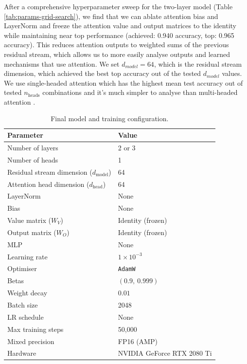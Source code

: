After a comprehensive hyperparameter sweep for the two-layer model (Table \ref{tab:params-grid-search}), we find that we can ablate attention bias and LayerNorm \cite{ba2016layer} and freeze the attention value and output matrices to the identity while maintaining near top performance (achieved: 0.940 accuracy, top: 0.965 accuracy). This reduces attention outputs to weighted sums of the previous residual stream, which allows us to more easily analyse outputs and learned mechanisms that use attention.
We set $d_{model} = 64$, which is the residual stream dimension, which achieved the best top accuracy out of the tested $d_{model}$ values.
We use single-headed attention which has the highest mean test accuracy out of tested $n_\text{heads}$ combinations and it's much simpler to analyse than multi-headed attention \cite{elhage2021mathematical}.

\begin{table}[htbp]
\caption{Final model and training configuration.}
\label{tab:model_config}
\centering
\begin{tabular}{lp{3.8cm}}
\toprule
\textbf{Parameter} & \textbf{Value} \\
\midrule
Number of layers & 2 or 3 \\
Number of heads & 1 \\
Residual stream dimension ($d_{\text{model}}$) & 64 \\
Attention head dimension ($d_{\text{head}}$) & 64 \\
LayerNorm & None \\
Bias & None \\
Value matrix ($W_V$) & Identity (frozen) \\
Output matrix ($W_O$) & Identity (frozen) \\
MLP & None \\
\midrule
Learning rate & $1 \times 10^{-3}$ \\
Optimiser & \texttt{AdamW} \\
Betas & $(0.9,\ 0.999)$ \\
Weight decay & $0.01$ \\
Batch size & 2048 \\
LR schedule & None \\
Max training steps & 50{,}000 \\
Mixed precision & FP16 (AMP) \\
\midrule
Hardware & NVIDIA GeForce RTX 2080 Ti \\
\bottomrule
\end{tabular}
\end{table}

